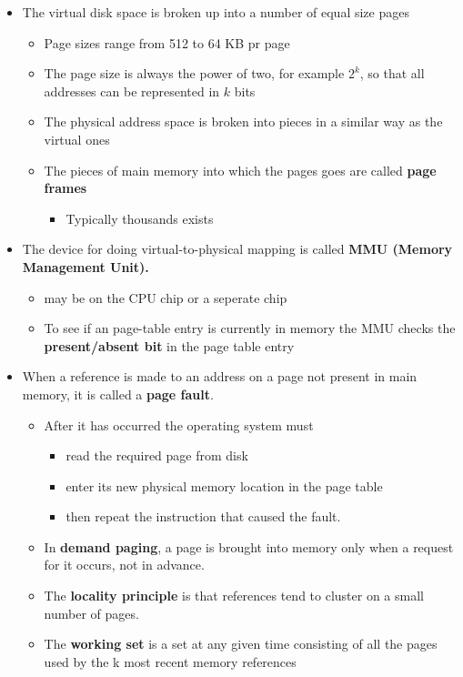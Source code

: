 \documentclass[11pt]{article}
\providecommand{\tightlist}{%
      \setlength{\itemsep}{0pt}\setlength{\parskip}{0pt}}
\begin{document}
\begin{itemize}
\tightlist
\item
  The virtual disk space is broken up into a number of equal size pages

  \begin{itemize}
  \tightlist
  \item
    Page sizes range from 512 to 64 KB pr page
  \item
    The page size is always the power of two, for example \(2^k\), so
    that all addresses can be represented in \(k\) bits
  \item
    The physical address space is broken into pieces in a similar way as
    the virtual ones
  \item
    The pieces of main memory into which the pages goes are called
    \textbf{page frames}

    \begin{itemize}
    \tightlist
    \item
      Typically thousands exists
    \end{itemize}
  \end{itemize}
\item
  The device for doing virtual-to-physical mapping is called \textbf{MMU
  (Memory Management Unit).}

  \begin{itemize}
  \tightlist
  \item
    may be on the CPU chip or a seperate chip
  \item
    To see if an page-table entry is currently in memory the MMU checks
    the \textbf{present/absent bit} in the page table entry
  \end{itemize}
\item
  When a reference is made to an address on a page not present in main
  memory, it is called a \textbf{page fault}.

  \begin{itemize}
  \tightlist
  \item
    After it has occurred the operating system must

    \begin{itemize}
    \tightlist
    \item
      read the required page from disk
    \item
      enter its new physical memory location in the page table
    \item
      then repeat the instruction that caused the fault.
    \end{itemize}
  \item
    In \textbf{demand paging}, a page is brought into memory only when a
    request for it occurs, not in advance.
  \item
    The \textbf{locality principle} is that references tend to cluster
    on a small number of pages.
  \item
    The \textbf{working set} is a set at any given time consisting of
    all the pages used by the k most recent memory references
  \end{itemize}
\end{itemize}
\end{document}
